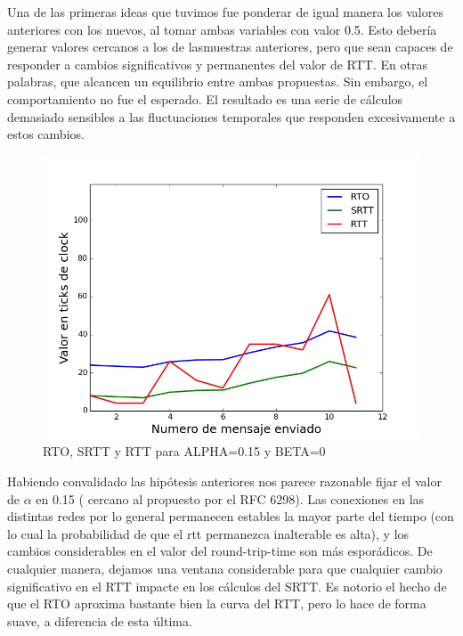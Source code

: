 Una de las primeras ideas que tuvimos fue
ponderar de igual manera los valores anteriores con los nuevos, al tomar ambas variables con valor
0.5. Esto debería generar valores cercanos a los de lasmuestras anteriores, pero que sean capaces
de responder a cambios significativos y permanentes del valor de RTT. En otras palabras, que alcancen
un equilibrio entre ambas propuestas. Sin embargo, el comportamiento no fue el esperado.
El resultado es una serie de cálculos demasiado sensibles a las fluctuaciones temporales que responden
excesivamente a estos cambios.

\begin{figure}[H]
  \begin{center}
      \includegraphics[scale=0.32]{imagenes/ALPHA_015_BETA_0.jpg}
      \caption{RTO, SRTT y RTT para ALPHA=0.15 y BETA=0}
  \end{center}
\end{figure}

Habiendo convalidado las hipótesis anteriores nos parece razonable fijar el valor de $\alpha$ en 0.15 (
cercano al propuesto por el RFC 6298). Las conexiones en las distintas redes por lo general permanecen
estables la mayor parte del tiempo (con lo cual la probabilidad de que el rtt permanezca inalterable
es alta), y los cambios considerables en el valor del round-trip-time son más esporádicos. De cualquier
manera, dejamos una ventana considerable para que cualquier cambio significativo en el RTT impacte
en los cálculos del SRTT. Es notorio el hecho de que el RTO aproxima bastante bien la curva del RTT, pero
lo hace de forma suave, a diferencia de esta última.


